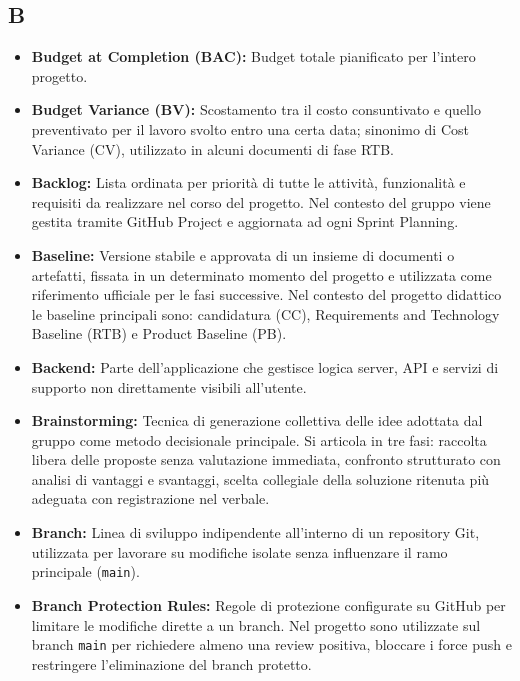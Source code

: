 {}
\subsection*{B}
\begin{itemize}[leftmargin=*]
      \item \textbf{Budget at Completion (BAC):} Budget totale pianificato per 
      l'intero progetto.
      \item \textbf{Budget Variance (BV):} Scostamento tra il costo consuntivato e quello preventivato per il lavoro svolto entro una certa data; sinonimo di Cost Variance (CV), utilizzato in alcuni documenti di fase RTB.
      \item \textbf{Backlog:} Lista ordinata per priorità di tutte le attività, funzionalità
      e requisiti da realizzare nel corso del progetto. Nel contesto del gruppo viene
      gestita tramite GitHub Project e aggiornata ad ogni Sprint
      Planning.
      \item \textbf{Baseline:} Versione stabile e approvata di un insieme di
          documenti o artefatti, fissata in un determinato momento del progetto
          e utilizzata come riferimento ufficiale per le fasi successive. Nel
          contesto del progetto didattico le baseline principali sono: candidatura
          (CC), Requirements and Technology Baseline (RTB) e Product Baseline (PB).
      \item \textbf{Backend:} Parte dell'applicazione che gestisce logica server, API e
      servizi di supporto non direttamente visibili all'utente.
      \item \textbf{Brainstorming:} Tecnica di generazione collettiva delle idee adottata
      dal gruppo come metodo decisionale principale. Si articola in tre fasi:
      raccolta libera delle proposte senza valutazione immediata, confronto
      strutturato con analisi di vantaggi e svantaggi, scelta collegiale della
      soluzione ritenuta più adeguata con registrazione nel verbale.
      \item \textbf{Branch:} Linea di sviluppo indipendente all'interno di un
          repository Git, utilizzata per lavorare su modifiche isolate senza
          influenzare il ramo principale (\texttt{main}).
      \item \textbf{Branch Protection Rules:} Regole di protezione configurate su GitHub per limitare le modifiche dirette a un branch. Nel progetto sono utilizzate sul branch \texttt{main} per richiedere almeno una review positiva, bloccare i force push e restringere l'eliminazione del branch protetto.

\end{itemize}
